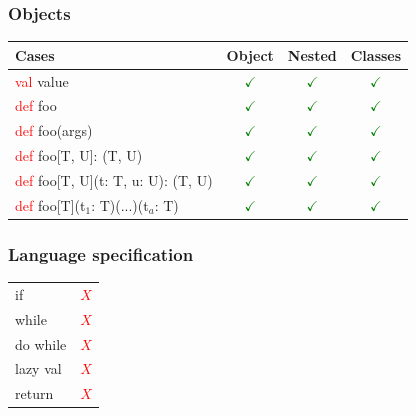 \documentclass{beamer}
\newcommand{\TCR}{\textcolor{red}}
\newcommand{\TCG}{\textcolor{green}}
\newcommand{\TCAG}{\textcolor{applegreen}}
\begin{document}
\begin{frame}
\frametitle{Objects}
\begin{table}
\begin{tabular}{lccc}
\toprule
Cases & Object & Nested & Classes\\
\midrule
\TCR{val} \TCAG{value} & \TCG{$\checkmark$} & \TCG{$\checkmark$} & \TCG{$\checkmark$} \\
\TCR{def} \TCAG{foo} & \TCG{$\checkmark$} & \TCG{$\checkmark$} & \TCG{$\checkmark$} \\
\TCR{def} \TCAG{foo}(args) & \TCG{$\checkmark$} & \TCG{$\checkmark$} & \TCG{$\checkmark$} \\
\TCR{def} \TCAG{foo}[T, U]: (T, U) & \TCG{$\checkmark$} & \TCG{$\checkmark$} & \TCG{$\checkmark$} \\
\TCR{def} \TCAG{foo}[T, U](t: T, u: U): (T, U) & \TCG{$\checkmark$} & \TCG{$\checkmark$} & \TCG{$\checkmark$} \\
\TCR{def} \TCAG{foo}[T](t$_1$: T)(...)(t$_a$: T) & \TCG{$\checkmark$} & \TCG{$\checkmark$} & \TCG{$\checkmark$} \\
\bottomrule
\end{tabular}
\end{table}
\end{frame}


\begin{frame}
\frametitle{Language specification}

\begin{table}
\begin{tabular}{lc}
\toprule
\midrule
if & \TCR{$X$} \\
while & \TCR{$X$} \\
do while & \TCR{$X$} \\
lazy val & \TCR{$X$} \\
return & \TCR{$X$} \\
\bottomrule
\end{tabular}
\end{table}
\end{frame}

\end{document}
